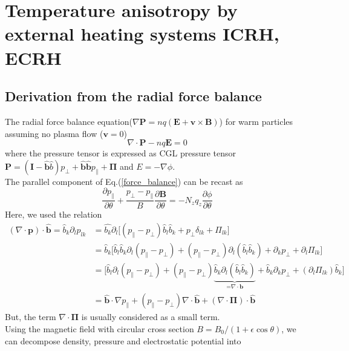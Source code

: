 \chapter{Temperature anisotropy by external heating systems ICRH, ECRH}

\section{Derivation from the radial force balance}
The radial force balance equation($\nabla \bm{P}=nq(\bm{E}+\bm{v}\times\bm{B})$) for warm particles assuming no plasma flow ($\bm{v}=0$)
\begin{equation}
    \nabla \cdot \bm{P} -nq\bm{E}=0
\label{force_balance}
\end{equation}
where the pressure tensor is expressed as CGL pressure tensor $\bm{P}=(\bm{I}-\hat{\bm{b}}\hat{b})p_\perp+\hat{\bm{b}}\hat{\bm{b}}p_\parallel+\bm{\Pi}$ and $E=-\nabla \phi$. \\
The parallel component of Eq.(\ref{force_balance}) can be recast as 
\begin{equation}
    \frac{\partial p_\parallel}{\partial \theta}+\frac{p_\perp-p_\parallel}{B}\frac{\partial \bm{B}}{\partial \theta}=-N_zq_z\frac{\partial \phi}{\partial \theta}
\label{parallel_force_balance}
\end{equation}
Here, we used the relation 
\begin{equation}
\begin{split}
    (\nabla \cdot \bm{p})\cdot \hat{\bm{b}}=\hat{b}_k\partial_l p_{lk} &=\hat{b_k}\partial_l\big[(p_\parallel-p_\perp)\hat{b}_l\hat{b}_k+p_\perp \delta_{lk}+\Pi_{lk}\big] \\
    &=\hat{b}_k\big[\hat{b}_l\hat{b}_k\partial_l(p_\parallel-p_\perp)+(p_\parallel-p_\perp)\partial_l(\hat{b}_l\hat{b}_k)+\partial_kp_\perp+\partial_l\Pi_{lk}\big] \\
    &=\big[\hat{b}_l\partial_l(p_\parallel-p_\perp)+(p_\parallel-p_\perp)\underbrace{\hat{b}_k\partial_l(\hat{b}_l\hat{b}_k)}_{\text{=$\nabla \cdot \bm{b}$}}+\hat{b}_k\partial_kp_\perp+(\partial_l\Pi_{lk})\hat{b}_k\big] \\
    &=\hat{\bm{b}}\cdot\nabla p_\parallel+(p_\parallel-p_\perp)\nabla \cdot \hat{\bm{b}}+(\nabla \cdot \bm{\Pi})\cdot \hat{\bm{b}}
\end{split}
\end{equation}
But, the term $\nabla \cdot \bm{\Pi}$ is usually considered as a small term. \\
Using the magnetic field with circular cross section $B=B_0/(1+\epsilon \cos\theta)$, we can decompose density, pressure and electrostatic potential into 
